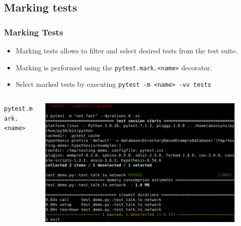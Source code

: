 \documentclass[t]{beamer}
\begin{document}
\subsection{Marking tests}
\begin{frame}[fragile=singleslide]
  \frametitle{Marking Tests}

   \begin{itemize}
       \item Marking tests allows to filter and select desired tests from the test suite.
       \item Marking is performed using the \texttt{pytest.mark.<name>} decorator.
       \item Select marked tests by executing \texttt{pytest -m <name> -vv tests}
   \end{itemize}

  \begin{columns}[T]
    \begin{column}{.5\textwidth}
      \vspace{-5pt}
      \begin{exampleblock}{\small \texttt{pytest.mark.<name>}}
        \inputminted[fontsize=\scriptsize]{python}{code/marked_test.py}
      \end{exampleblock}
    \end{column}

    \begin{column}{.5\textwidth}
      \centering
      \href{https://asciinema.org/a/535244}{\includegraphics[width=0.9\textwidth]{figures/pytest_mark.png}}
    \end{column}
  \end{columns}

\end{frame}
\end{document}
